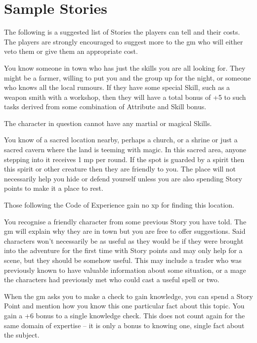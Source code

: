 \section{Sample Stories}

\begin{multicols}{2}

\noindent
The following is a suggested list of Stories the players can tell and their costs. The players are strongly encouraged to suggest more to the \gls{gm} who will either veto them or give them an appropriate cost.

You know someone in town who has just the skills you are all looking for.
They might be a farmer, willing to put you and the group up for the night, or someone who knows all the local rumours.
If they have some special Skill, such as a weapon smith with a workshop, then they will have a total bonus of +5 to such tasks derived from some combination of Attribute and Skill bonus.

The character in question cannot have any martial or magical Skills.

You know of a sacred location nearby, perhaps a church, or a shrine or just a sacred cavern where the land is teeming with magic.
In this sacred area, anyone stepping into it receives 1 \gls{mp} per \gls{round}.
If the spot is guarded by a spirit then this spirit or other creature then they are friendly to you.
The place will not necessarily help you hide or defend yourself unless you are also spending Story points to make it a place to rest.

Those following the Code of Experience gain no \gls{xp} for finding this location.

You recognise a friendly character from some previous Story you have told. The \gls{gm} will explain why they are in town but you are free to offer suggestions. Said characters won't necessarily be as useful as they would be if they were brought into the adventure for the first time with Story points and may only help for a scene, but they should be somehow useful. This may include a trader who was previously known to have valuable information about some situation, or a mage the characters had previously met who could cast a useful spell or two.

When the \gls{gm} asks you to make a check to gain knowledge, you can spend a Story Point and mention how you know this one particular fact about this topic. You gain a +6 bonus to a single knowledge check. This does not count again for the same domain of expertise -- it is only a bonus to knowing one, single fact about the subject.


\end{multicols}
